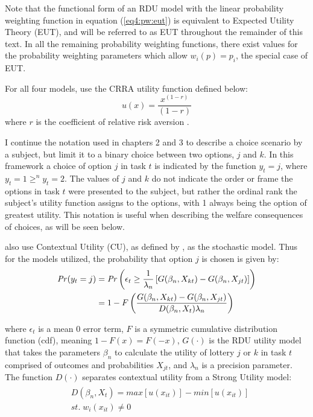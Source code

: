 \documentclass[../main.tex]{subfiles}
\begin{document}
Note that the functional form of an RDU model with the linear probability weighting function in equation (\ref{eq4:pw:eut}) is equivalent to Expected Utility Theory (EUT), and will be referred to as EUT throughout the remainder of this text.
In all the remaining probability weighting functions, there exist values for the probability weighting parameters which allow $w_i(p) = p_i$, the special case of EUT.

For all four models, \textcite{Harrison2016} use the CRRA utility function defined below:
\begin{equation}
	\label{eq4:CRRA}
	u(x) = \frac{x^{(1-r)}}{(1-r)}
\end{equation}
\noindent where $r$ is the coefficient of relative risk aversion \parencite{Pratt1964}.

I continue the notation used in chapters 2 and 3 to describe a choice scenario by a subject, but limit it to a binary choice between two options, $j$ and $k$.
In this framework a choice of option $j$ in task $t$ is indicated by the function $y_t = j$, where $y_t = 1 \geq^n y_t = 2$.
The values of $j$ and $k$ do not indicate the order or frame the options in task $t$ were presented to the subject, but rather the ordinal rank the subject's utility function assigns to the options, with 1 always being the option of greatest utility.
This notation is useful when describing the welfare consequences of choices, as will be seen below.

\textcite{Harrison2016} also use Contextual Utility (CU), as defined by \textcite{Wilcox2008}, as the stochastic model.
Thus for the models utilized, the probability that option $j$ is chosen is given by:
\begin{align}
	\label{eq4:RE.2}
	\begin{split}
		{\ensuremath{\mathit{Pr}}}(y_t = j) &= {\mathit{Pr}}\left(  \epsilon_t \geq \frac{1}{\lambda_n} \left[ G(\beta_n,X_{kt}) - G(\beta_n,X_{jt}) \right] \right)\\
		&= 1 - F\left( \dfrac{G(\beta_n,X_{kt}) - G(\beta_n,X_{jt})}{D(\beta_n,X_t)\lambda_n }  \right)
	\end{split}
\end{align}

\noindent where $\epsilon_t$ is a mean 0 error term, $F$ is a symmetric cumulative distribution function (cdf), meaning $1 - F(x)  = F(-x)$, $G(\cdot)$ is the RDU utility model that takes the parameters $\beta_n$ to calculate the utility of lottery $j$ or $k$ in task $t$ comprised of outcomes and probabilities $X_{jt}$, and $\lambda_n$ is a precision parameter.
The function $D(\cdot)$ separates contextual utility from a Strong Utility model:
\begin{align}
	\label{eq4:W.cu}
	\begin{split}
		&D(\beta_n,X_t) = \mathit{max}[u(x_{it})] - \mathit{min}[u(x_{it})]\\
		&\mathit{st.}\; w_i(x_{it}) \neq 0
	\end{split}
\end{align}
\end{document}
